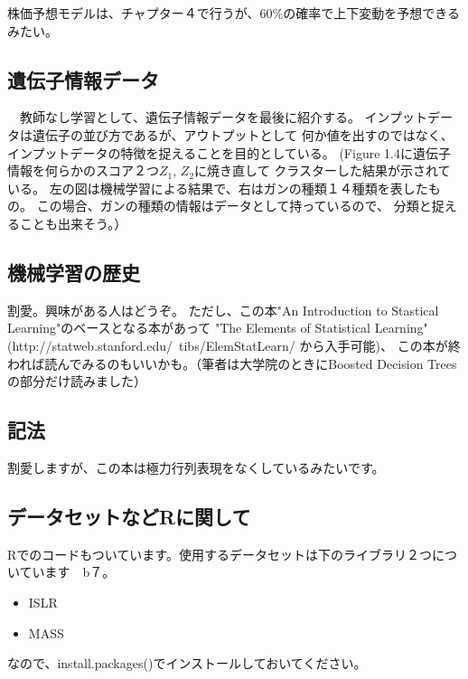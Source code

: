 \documentclass{jsarticle}
\begin{document}
株価予想モデルは、チャプター４で行うが、60\%の確率で上下変動を予想できるみたい。

\subsection{遺伝子情報データ}
　教師なし学習として、遺伝子情報データを最後に紹介する。
インプットデータは遺伝子の並び方であるが、アウトプットとして
何か値を出すのではなく、インプットデータの特徴を捉えることを目的としている。
(Figure 1.4に遺伝子情報を何らかのスコア２つ$Z_1$, $Z_2$に焼き直して
クラスターした結果が示されている。
左の図は機械学習による結果で、右はガンの種類１４種類を表したもの。
この場合、ガンの種類の情報はデータとして持っているので、
分類と捉えることも出来そう。）

\subsection{機械学習の歴史}
割愛。興味がある人はどうぞ。
ただし、この本"An Introduction to Stastical Learning"のベースとなる本があって
"The Elements of Statistical Learning" (http://statweb.stanford.edu/~tibs/ElemStatLearn/ から入手可能)、
この本が終われば読んでみるのもいいかも。（筆者は大学院のときにBoosted Decision Treesの部分だけ読みました）

\subsection{記法}
割愛しますが、この本は極力行列表現をなくしているみたいです。

\subsection{データセットなどRに関して}
Rでのコードもついています。使用するデータセットは下のライブラリ２つについています　b７。
\begin{itemize}
\item ISLR
\item MASS
\end{itemize}
なので、install.packages()でインストールしておいてください。
\end{document}

